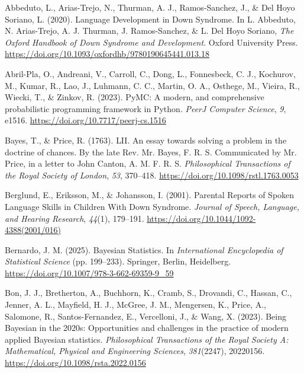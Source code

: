 \documentclass[
  11pt,
  a4paper,
]{report}
\newlength{\cslhangindent}
\newenvironment{CSLReferences}[2] %
 {\begin{list}{}{%
  \setlength{\itemindent}{0pt}
  \setlength{\leftmargin}{0pt}
  \setlength{\parsep}{0pt}
  \ifodd #1
   \setlength{\leftmargin}{\cslhangindent}
   \setlength{\itemindent}{-1\cslhangindent}
  \fi
  \setlength{\itemsep}{#2\baselineskip}}}
 {\end{list}}
\begin{document}
\protect{}\label{refs}
\begin{CSLReferences}{1}{0}
Abbeduto, L., Arias-Trejo, N., Thurman, A. J., Ramos-Sanchez, J., \& Del
Hoyo Soriano, L. (2020). Language {Development} in {Down Syndrome}. In
L. Abbeduto, N. Arias-Trejo, A. J. Thurman, J. Ramos-Sanchez, \& L. Del
Hoyo Soriano, \emph{The {Oxford Handbook} of {Down Syndrome} and
{Development}}. Oxford University Press.
\url{https://doi.org/10.1093/oxfordhb/9780190645441.013.18}

Abril-Pla, O., Andreani, V., Carroll, C., Dong, L., Fonnesbeck, C. J.,
Kochurov, M., Kumar, R., Lao, J., Luhmann, C. C., Martin, O. A.,
Osthege, M., Vieira, R., Wiecki, T., \& Zinkov, R. (2023). {PyMC}: A
modern, and comprehensive probabilistic programming framework in
{Python}. \emph{PeerJ Computer Science}, \emph{9}, e1516.
\url{https://doi.org/10.7717/peerj-cs.1516}

Bayes, T., \& Price, R. (1763). {LII}. {An} essay towards solving a
problem in the doctrine of chances. {By} the late {Rev}. {Mr}. {Bayes},
{F}. {R}. {S}. Communicated by {Mr}. {Price}, in a letter to {John
Canton}, {A}. {M}. {F}. {R}. {S}. \emph{Philosophical Transactions of
the Royal Society of London}, \emph{53}, 370--418.
\url{https://doi.org/10.1098/rstl.1763.0053}

Berglund, E., Eriksson, M., \& Johansson, I. (2001). Parental {Reports}
of {Spoken Language Skills} in {Children With Down Syndrome}.
\emph{Journal of Speech, Language, and Hearing Research}, \emph{44}(1),
179--191. \url{https://doi.org/10.1044/1092-4388(2001/016)}

Bernardo, J. M. (2025). Bayesian {Statistics}. In \emph{International
{Encyclopedia} of {Statistical Science}} (pp. 199--233). Springer,
Berlin, Heidelberg. \url{https://doi.org/10.1007/978-3-662-69359-9_59}

Bon, J. J., Bretherton, A., Buchhorn, K., Cramb, S., Drovandi, C.,
Hassan, C., Jenner, A. L., Mayfield, H. J., McGree, J. M., Mengersen,
K., Price, A., Salomone, R., Santos-Fernandez, E., Vercelloni, J., \&
Wang, X. (2023). Being {Bayesian} in the 2020s: Opportunities and
challenges in the practice of modern applied {Bayesian} statistics.
\emph{Philosophical Transactions of the Royal Society A: Mathematical,
Physical and Engineering Sciences}, \emph{381}(2247), 20220156.
\url{https://doi.org/10.1098/rsta.2022.0156}


\end{CSLReferences}
\end{document}
